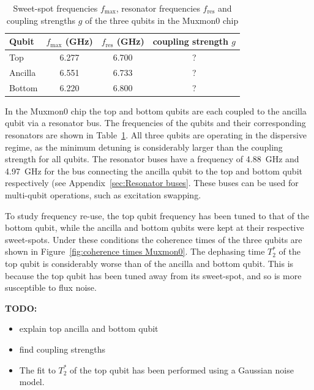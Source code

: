       \begin{table}
        \begin{tabular}{l || c | c | c}
          Qubit  & $f_\text{max}$ (GHz) & $f_\text{res}$ (GHz) & coupling strength $g$ \\
          \hline
          Top    & 6.277                & 6.700                & ?\\
          Ancilla& 6.551                & 6.733                & ? \\
          Bottom & 6.220                & 6.800                & ?
        \end{tabular}
        \caption{Sweet-spot frequencies $f_\text{max}$, resonator frequencies $f_\text{res}$ and coupling strengths $g$ of the three qubits in the Muxmon0 chip}
        \label{tab:Muxmon0 qubit properties}
      \end{table}
      In the Muxmon0 chip the top and bottom qubits are each coupled to the ancilla qubit via a resonator bus. The frequencies of the qubits and their corresponding resonators are shown in Table~\ref{tab:Muxmon0 qubit properties}. All three qubits are operating in the dispersive regime, as the minimum detuning is considerably larger than the coupling strength for all qubits. The resonator buses have a frequency of \SI{4.88}{\giga \hertz} and \SI{4.97}{\giga \hertz} for the bus connecting the ancilla qubit to the top and bottom qubit respectively (see Appendix~\ref{sec:Resonator buses}. These buses can be used for multi-qubit operations, such as excitation swapping.

      To study frequency re-use, the top qubit frequency has been tuned to that of the bottom qubit, while the ancilla and bottom qubits were kept at their respective sweet-spots. Under these conditions the coherence times of the three qubits are shown in Figure~\ref{fig:coherence times Muxmon0}. The dephasing time $T_2^*$ of the top qubit is considerably worse than of the ancilla and bottom qubit. This is because the top qubit has been tuned away from its sweet-spot, and so is more susceptible to flux noise.

      \textbf{TODO:}
      \begin{itemize}
        \item explain top ancilla and bottom qubit
        \item find coupling strengths
        \item  The fit to $T_2^*$ of the top qubit has been performed using a Gaussian noise model.
      \end{itemize}


